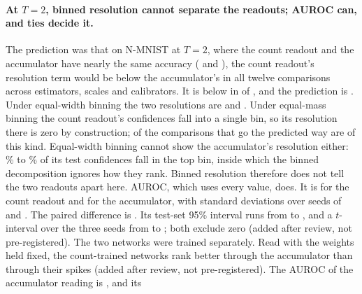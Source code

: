 \documentclass[10pt]{article}
\begin{document}
\paragraph{At $T=2$, binned resolution cannot separate the readouts; AUROC can, and ties decide it.} The prediction
was that on N-MNIST at $T=2$, where the count readout and the accumulator have nearly the same %
accuracy (\roCountAcc{} and \roAccAcc),
the count readout's resolution term would be below the accumulator's in all twelve comparisons
across estimators, scales and calibrators. It is below in \nineBelow{} of \nineTotal{}, and the %
prediction is \verdictNine. Under equal-width binning the two resolutions are \resCountW{} and %
\resAccumW. Under equal-mass binning the count readout's confidences fall into a single bin, so its %
resolution there is zero by construction; \nineBelowDegenerate{} of the comparisons that go the %
predicted way are of this kind. Equal-width binning cannot show the accumulator's resolution either:
\topBinAccNmTwoMin\% to \topBinAccNmTwoMax\% of its test confidences fall in the top bin, inside %
which the binned decomposition ignores how they rank. Binned resolution therefore does not tell the
two readouts apart here. AUROC, which uses every value, does. It is \hdAurocCount{} for the count %
readout and \hdAurocAccum{} for the accumulator, with standard deviations over seeds of %
\hdAurocCountSd{} and \hdAurocAccumSd. The paired difference is \hdAurocDiff. Its test-set 95\% %
interval runs from \hdAurocDiffLo{} to \hdAurocDiffHi, and a $t$-interval over the three seeds %
from \hdAurocDiffTLo{} to \hdAurocDiffTHi; both exclude zero (added after review, not %
pre-registered). The two networks were trained separately. Read with the weights held fixed, the
count-trained networks rank better through the accumulator than through their spikes (added after
review, not pre-registered). The AUROC of the accumulator reading is \swrAurocAccum, and its %
\end{document}
